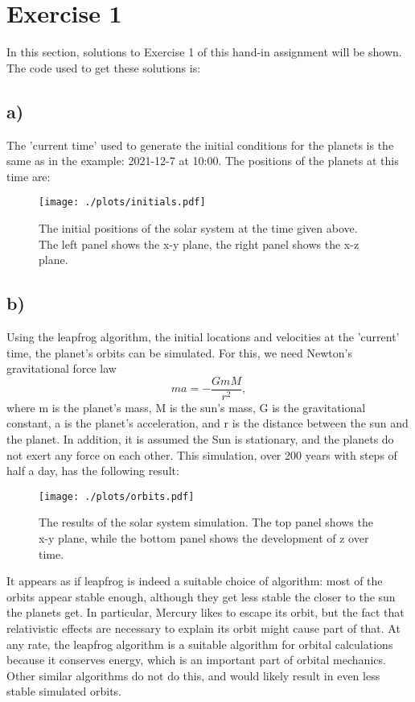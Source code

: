 \section{Exercise 1}
In this section, solutions to Exercise 1 of this hand-in assignment will be shown. The code used to get these solutions is:


\subsection*{a)}
The 'current time' used to generate the initial conditions for the planets is the same as in the example: 2021-12-7 at 10:00. The positions of the planets at this time are:
\begin{figure}
    \centering
    \texttt{[image: ./plots/initials.pdf]}
    \caption{The initial positions of the solar system at the time given above. The left panel shows the x-y plane, the right panel shows the x-z plane.}
    \label{fig:initial}
\end{figure}
\subsection*{b)}
Using the leapfrog algorithm, the initial locations and velocities at the 'current' time, the planet's orbits can be simulated. For this, we need Newton's gravitational force law
\begin{equation}
    ma = -\frac{GmM}{r^2},
\end{equation}
where m is the planet's mass, M is the sun's mass, G is the gravitational constant, a is the planet's acceleration, and r is the distance between the sun and the planet. In addition, it is assumed the Sun is stationary, and the planets do not exert any force on each other. This simulation, over 200 years with steps of half a day, has the following result:
\begin{figure}
    \centering
    \texttt{[image: ./plots/orbits.pdf]}
    \caption{The results of the solar system simulation. The top panel shows the x-y plane, while the bottom panel shows the development of z over time.}
    \label{fig:orbits}
\end{figure}
It appears as if leapfrog is indeed a suitable choice of algorithm: most of the orbits appear stable enough, although they get less stable the closer to the sun the planets get. In particular, Mercury likes to escape its orbit, but the fact that relativistic effects are necessary to explain its orbit might cause part of that. 
At any rate, the leapfrog algorithm is a suitable algorithm for orbital calculations because it conserves energy, which is an important part of orbital mechanics. Other similar algorithms do not do this, and would likely result in even less stable simulated orbits.
